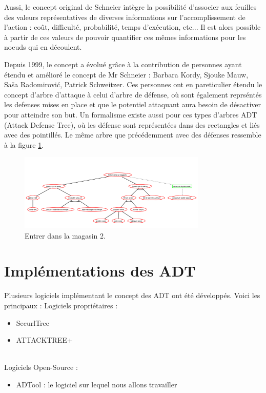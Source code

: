 		Aussi, le concept original de Schneier intègre la possibilité d'associer aux feuilles des valeurs représentatives de diverses informations sur l'accomplissement de l'action : coût, difficulté, probabilité, temps d'exécution, etc... Il est alors possible à partir de ces valeurs de pouvoir quantifier ces mêmes informations pour les noeuds qui en découlent.

		Depuis 1999, le concept a évolué grâce à la contribution de personnes ayant étendu et amélioré le concept de Mr Schneier : Barbara Kordy, Sjouke Mauw, Saša Radomirović, Patrick Schweitzer. Ces personnes ont en pareticulier étendu le concept d'arbre d'attaque à celui d'arbre de défense, où sont également reprséntés les defenses mises en place et que le potentiel attaquant aura besoin de désactiver pour atteindre son but. Un formalisme existe aussi pour ces types d'arbres ADT (Attack Defense Tree), où les défense sont représentées dans des rectangles et liés avec des pointillés. Le même arbre que précédemment avec des défenses ressemble à la figure \ref{fig:arbre_exemple_2}.

		\begin{figure}[h!]
            \begin{center}
                \includegraphics[width=0.8\textwidth]{figure/Entrer_dans_un_magasin2.png}
            \end{center}
            \caption{Entrer dans la magasin 2.}
            \label{fig:arbre_exemple_2}
		\end{figure}

	\section{Implémentations des ADT}
		Plusieurs logiciels implémentant le concept des ADT ont été développés. Voici les principaux :
		\large Logiciels propriétaires :
		\begin{itemize}
			\item SecurlTree
			\item ATTACKTREE+
		\end{itemize}
		~~\\
		\large Logiciels Open-Source :
		\begin{itemize}
			\item ADTool : le logiciel sur lequel nous allons travailler
		\end{itemize}

